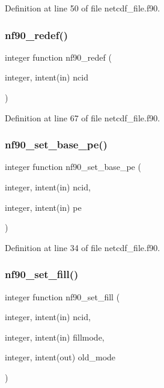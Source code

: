 Definition at line 50 of file netcdf\+\_\+file.\+f90.

\mbox{\label{netcdf__file_8f90_ae3b9855ad30a9b042a7211ca0eb7eb3b}} 
\subsubsection{\texorpdfstring{nf90\+\_\+redef()}{nf90\_redef()}}
{\footnotesize\ttfamily integer function nf90\+\_\+redef (\begin{DoxyParamCaption}\item[{integer, intent(in)}]{ncid }\end{DoxyParamCaption})}



Definition at line 67 of file netcdf\+\_\+file.\+f90.

\mbox{\label{netcdf__file_8f90_afd3d1288b0bff0c6d7efc465935f981b}} 
\subsubsection{\texorpdfstring{nf90\+\_\+set\+\_\+base\+\_\+pe()}{nf90\_set\_base\_pe()}}
{\footnotesize\ttfamily integer function nf90\+\_\+set\+\_\+base\+\_\+pe (\begin{DoxyParamCaption}\item[{integer, intent(in)}]{ncid,  }\item[{integer, intent(in)}]{pe }\end{DoxyParamCaption})}



Definition at line 34 of file netcdf\+\_\+file.\+f90.

\mbox{\label{netcdf__file_8f90_a5857d0f422d90038aa5a748893f0d7fc}} 
\subsubsection{\texorpdfstring{nf90\+\_\+set\+\_\+fill()}{nf90\_set\_fill()}}
{\footnotesize\ttfamily integer function nf90\+\_\+set\+\_\+fill (\begin{DoxyParamCaption}\item[{integer, intent(in)}]{ncid,  }\item[{integer, intent(in)}]{fillmode,  }\item[{integer, intent(out)}]{old\+\_\+mode }\end{DoxyParamCaption})}



